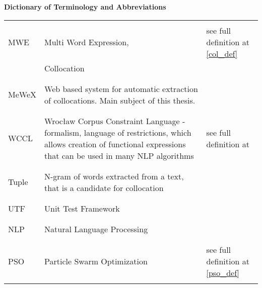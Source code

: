 \textbf{\LARGE Dictionary of Terminology and Abbreviations}

\vspace{1cm}

{\centering
\begin{tabular*}{\textwidth}{L{0.2\textwidth} L{0.5\textwidth} L{0.25\textwidth}}%
    \hline \\
    MWE & Multi Word Expression, & see full definition at \ref{col_def}\\
        & Collocation &  \\
    \\ \hline \\
    MeWeX & Web based system for automatic extraction of collocations. Main subject of this thesis. \\
    \\ \hline \\
    WCCL & Wrocław Corpus Constraint Language - formalism, language of restrictions, which allows creation of 
    functional expressions that can be used in many NLP algorithms & see full definition at \cite{wccl}\\
    \\ \hline \\
    Tuple & N-gram of words extracted from a text, that is a candidate for collocation \\
    \\ \hline \\
    UTF & Unit Test Framework \\
    \\ \hline \\
    NLP & Natural Language Processing \\
    \\ \hline \\
    PSO & Particle Swarm Optimization & see full definition at \ref{pso_def}\\
    \\\hline
\end{tabular*} }
    
